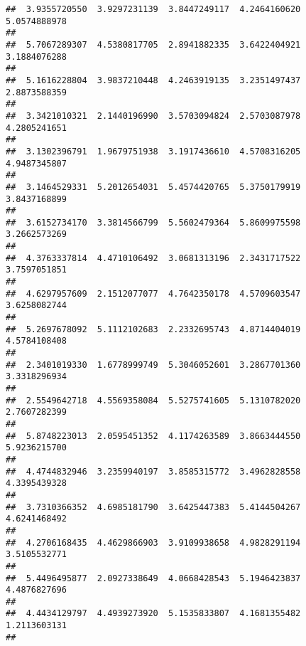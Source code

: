 \documentclass[]{article}
\begin{document}
\begin{verbatim}
##  3.9355720550  3.9297231139  3.8447249117  4.2464160620  5.0574888978 
##                                                                       
##  5.7067289307  4.5380817705  2.8941882335  3.6422404921  3.1884076288 
##                                                                       
##  5.1616228804  3.9837210448  4.2463919135  3.2351497437  2.8873588359 
##                                                                       
##  3.3421010321  2.1440196990  3.5703094824  2.5703087978  4.2805241651 
##                                                                       
##  3.1302396791  1.9679751938  3.1917436610  4.5708316205  4.9487345807 
##                                                                       
##  3.1464529331  5.2012654031  5.4574420765  5.3750179919  3.8437168899 
##                                                                       
##  3.6152734170  3.3814566799  5.5602479364  5.8609975598  3.2662573269 
##                                                                       
##  4.3763337814  4.4710106492  3.0681313196  2.3431717522  3.7597051851 
##                                                                       
##  4.6297957609  2.1512077077  4.7642350178  4.5709603547  3.6258082744 
##                                                                       
##  5.2697678092  5.1112102683  2.2332695743  4.8714404019  4.5784108408 
##                                                                       
##  2.3401019330  1.6778999749  5.3046052601  3.2867701360  3.3318296934 
##                                                                       
##  2.5549642718  4.5569358084  5.5275741605  5.1310782020  2.7607282399 
##                                                                       
##  5.8748223013  2.0595451352  4.1174263589  3.8663444550  5.9236215700 
##                                                                       
##  4.4744832946  3.2359940197  3.8585315772  3.4962828558  4.3395439328 
##                                                                       
##  3.7310366352  4.6985181790  3.6425447383  5.4144504267  4.6241468492 
##                                                                       
##  4.2706168435  4.4629866903  3.9109938658  4.9828291194  3.5105532771 
##                                                                       
##  5.4496495877  2.0927338649  4.0668428543  5.1946423837  4.4876827696 
##                                                                       
##  4.4434129797  4.4939273920  5.1535833807  4.1681355482  1.2113603131 
##                                                                       

\end{verbatim}
\end{document}
